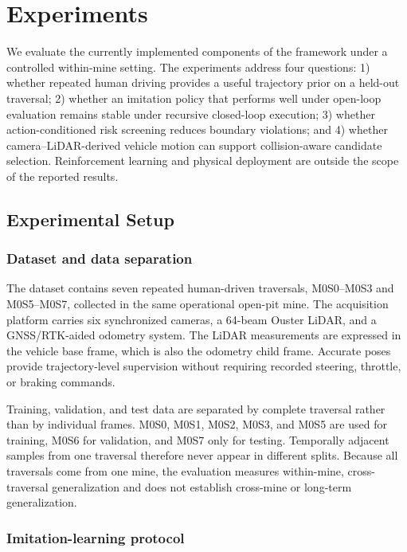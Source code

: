 \section{Experiments}
\label{sec:experiments}

We evaluate the currently implemented components of the framework under a controlled within-mine setting. The experiments address four questions: 1) whether repeated human driving provides a useful trajectory prior on a held-out traversal; 2) whether an imitation policy that performs well under open-loop evaluation remains stable under recursive closed-loop execution; 3) whether action-conditioned risk screening reduces boundary violations; and 4) whether camera--LiDAR-derived vehicle motion can support collision-aware candidate selection. Reinforcement learning and physical deployment are outside the scope of the reported results.

\subsection{Experimental Setup}
\label{sec:experimental_setup}

\subsubsection{Dataset and data separation}

The dataset contains seven repeated human-driven traversals, M0S0--M0S3 and M0S5--M0S7, collected in the same operational open-pit mine. The acquisition platform carries six synchronized cameras, a 64-beam Ouster LiDAR, and a GNSS/RTK-aided odometry system. The LiDAR measurements are expressed in the vehicle base frame, which is also the odometry child frame. Accurate poses provide trajectory-level supervision without requiring recorded steering, throttle, or braking commands.

Training, validation, and test data are separated by complete traversal rather than by individual frames. M0S0, M0S1, M0S2, M0S3, and M0S5 are used for training, M0S6 for validation, and M0S7 only for testing. Temporally adjacent samples from one traversal therefore never appear in different splits. Because all traversals come from one mine, the evaluation measures within-mine, cross-traversal generalization and does not establish cross-mine or long-term generalization.

\subsubsection{Imitation-learning protocol}

